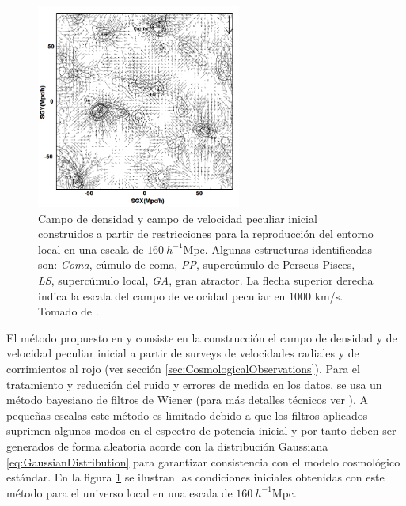 \begin{figure}[htbp]
	\centering
	\includegraphics[width=0.60\textwidth]
	{./figures/3_nbody_simulations/Constrained_Construction.png}

	\caption{\small{Campo de densidad y campo de velocidad peculiar inicial
	construidos a partir de restricciones para la reproducción del entorno
	local en una escala de $160\ h^{-1}$Mpc. Algunas estructuras 
	identificadas son: \textit{Coma}, cúmulo de coma, \textit{PP}, supercúmulo 
	de Perseus-Pisces, \textit{LS}, supercúmulo local, \textit{GA}, gran 
	atractor. La flecha superior derecha indica la escala del campo de 
	velocidad peculiar en $1000$ km/s. Tomado de \cite{Klypin2003}.}}
	
	\label{fig:Constrained_Construction}
\end{figure}


El método propuesto en \cite{Klypin2003} y \cite{Hoffman1991} consiste en 
la construcción el campo de densidad y de velocidad peculiar inicial a 
partir de surveys de velocidades radiales y de corri\-mientos al rojo (ver 
sección \ref{sec:CosmologicalObservations}). Para el tratamiento y 
reducción del ruido y errores de medida en los datos, se usa un método 
bayesiano de filtros de Wiener (para más detalles técnicos ver 
\cite{Zaroubi1999}). A pequeñas escalas este método es limitado debido a 
que los filtros aplicados suprimen algunos modos en el espectro de potencia 
inicial y por tanto deben ser generados de forma aleatoria acorde con la 
distribución Gaussiana \ref{eq:GaussianDistribution} para garantizar 
consistencia con el modelo cosmológico estándar. En la figura 
\ref{fig:Constrained_Construction} se ilustran las condiciones iniciales 
obtenidas con este método para el universo local en una escala de 
$160\ h^{-1}$Mpc.



